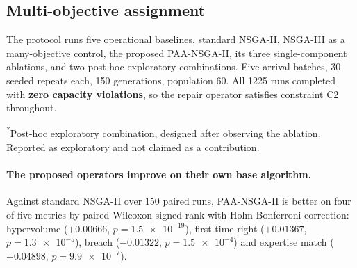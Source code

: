 
\subsection{Multi-objective assignment}
\label{sec:assignment-results}

The protocol runs five operational baselines, standard NSGA-II, NSGA-III as a many-objective
control, the proposed PAA-NSGA-II, its three single-component ablations, and two post-hoc
exploratory combinations. Five arrival batches, 30 seeded repeats each, 150 generations,
population 60. All \num{1225} runs completed with \textbf{zero capacity violations}, so the repair
operator satisfies constraint C2 throughout.

\begin{table}[htbp]
\centering
\caption{Assignment policies on BPI Challenge 2014. Hypervolume is computed against a
reference point fixed as the nadir across all variants and all runs within a batch. Objectives
$f_1$ and $f_4$ are maximised, $f_2$ and $f_3$ minimised. Jain's index is reported alongside
the $f_3$ standard deviation and is not substituted for it.}
\label{tab:assignment}
\small



\vspace{0.4em}
{\footnotesize \textsuperscript{*}Post-hoc exploratory combination, designed after observing
the ablation. Reported as exploratory and not claimed as a contribution.}
\end{table}

\paragraph{The proposed operators improve on their own base algorithm.}
Against standard NSGA-II over 150 paired runs, PAA-NSGA-II is better on four of five metrics
by paired Wilcoxon signed-rank with Holm-Bonferroni correction: hypervolume
($+\num{0.00666}$, $p = \num{1.5e-19}$), first-time-right ($+\num{0.01367}$,
$p = \num{1.3e-5}$), breach ($-\num{0.01322}$, $p = \num{1.5e-4}$) and expertise match
($+\num{0.04898}$, $p = \num{9.9e-7}$).


